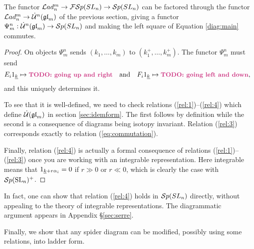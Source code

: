\documentclass[10pt,leqno]{article}
\begin{document}
\begin{prop}
\label{prop:psi}
The functor $\mathcal{L}ad_n^m \to {\mathcal{FS}p}(SL_n) \to {\mathcal{S}p}(SL_n)$ can be factored through the functor $\mathcal{L}ad_n^m \to \dot{{\mathcal{U}}}^n({\mathfrak{gl}}_m)$ of the previous section, giving a functor $\Psi_m^n : \dot{{\mathcal{U}}}^n({\mathfrak{gl}}_m) \to {\mathcal{S}p}(SL_n)$ and making  the left square of Equation \eqref{diag:main} commutes.
\end{prop}
\begin{proof}
On objects $\Psi_m^n$ sends $(k_1,\ldots,k_m)$ to $(k_1^+,\ldots,k_m^+)$.
The functor $\Psi_m^n$ must send
$$E_i \one_{\ul{k}} \mapsto \todo{going up and right}  \ \ \text{ and }  \ \ F_i \one_{\ul{k}} \mapsto \todo{going left and down},$$
and this uniquely determines it.


To see that it is well-defined, we need to check relations (\ref{rel:1})--(\ref{rel:4}) which define $\dot{{\mathcal{U}}}({\mathfrak{gl}}_m)$ in section \ref{sec:idemform}. The first follows by definition while the second is a consequence of diagrams being isotopy invariant. Relation (\ref{rel:3}) corresponds exactly to relation (\ref{eq:commutation}). 

Finally, relation (\ref{rel:4}) is actually a formal consequence of relations (\ref{rel:1})--(\ref{rel:3}) once you are working with an integrable representation. Here integrable means that $1_{{\underline{k}}+r\alpha_i} = 0$ if $r \gg 0$ or $r \ll 0$, which is clearly the case with ${\mathcal{S}p}({\rm{SL}}_n)^+$. 
\end{proof}

\begin{rem}
In fact, one can show that relation  (\ref{rel:4}) holds in ${\mathcal{S}p}(SL_n)$ directly, without appealing to the theory of integrable representations. The diagrammatic argument appears in Appendix \S \ref{sec:serre}.
\end{rem}

Finally, we show that any spider diagram can be modified, possibly using some relations, into ladder form. 
\end{document}
